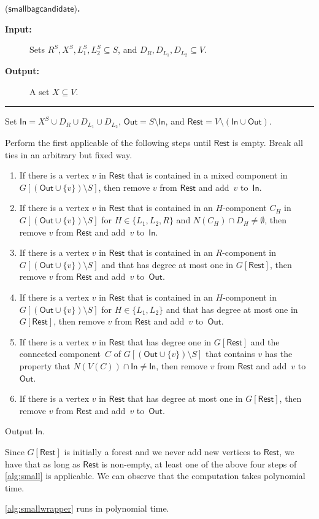 \documentclass[a4paper,UKenglish,cleveref, autoref, thm-restate, numberwithinsect]{lipics-v2021}
\newcounter{algorithm}
\newenvironment{algorithm}[3][]{\refstepcounter{algorithm}\renewcommand{\arraystretch}{.6}
\begin{center}
\begin{mdframed}[nobreak=true]{\normalsize\sffamily{\bfseries Algorithm~\thealgorithm} (#1){\bfseries .}}

\vspace{-2ex}
\begin{normalsize}
\begin{description}
 \item[\textbf{Input:}]  #2
 \item[\textbf{Output:}]  #3
\end{description}

\vspace{-1ex}

\hrule

\vspace{1ex}

}
{
\end{normalsize}
\end{mdframed}
\end{center}
}
\newcommand{\smallbagc}{\mathsf{smallbagcandidate}}
\newcommand{\In}{\mathsf{In}}
\newcommand{\Out}{\mathsf{Out}}
\newcommand{\Rest}{\mathsf{Rest}}
\begin{document}
\begin{algorithm}[$\smallbagc$]{Sets $R^S,X^S,L_1^S,L_2^S\subseteq S$, and $D_R,D_{L_1},D_{L_2}\subseteq V$.}{A set $X\subseteq V$.}\label{alg:small}
Set $\In=X^S\cup D_R\cup D_{L_1}\cup D_{L_2}$, $\Out=S\setminus \In$, and $\Rest=V\setminus (\In\cup\Out)$.

Perform the first applicable of the following steps until $\Rest$ is empty.  Break all ties in an arbitrary but fixed way.
\begin{enumerate}
\item If there is a vertex $v$ in $\Rest$ that is contained in a mixed component in $G[(\Out\cup\{v\})\setminus S]$, then remove $v$ from $\Rest$ and add~$v$ to~$\In$.\label{regular:step1}
\item If there is a vertex $v$ in $\Rest$ that is contained in an $H$-component $C_H$ in $G[(\Out\cup\{v\})\setminus S]$ for $H\in\{L_1,L_2,R\}$ and $N(C_H)\cap D_H\neq \emptyset$, then remove $v$ from $\Rest$ and add~$v$ to~$\In$.\label{regular:step2}
\item If there is a vertex $v$ in $\Rest$ that is contained in an $R$-component in $G[(\Out\cup\{v\})\setminus S]$ and that has degree at most one in $G[\Rest]$, then remove $v$ from $\Rest$ and add~$v$ to~$\Out$.\label{regular:step3}
\item If there is a vertex $v$ in $\Rest$ that is contained in an $H$-component in $G[(\Out\cup\{v\})\setminus S]$ for $H\in\{L_1,L_2\}$ and that has degree at most one in $G[\Rest]$, then remove $v$ from $\Rest$ and add~$v$ to~$\Out$.\label{regular:step4}
\item If there is a vertex $v$ in $\Rest$ that has degree one in $G[\Rest]$ and the connected component~$C$ of $G[(\Out\cup\{v\})\setminus S]$ that contains $v$ has the property that $N(V(C))\cap \In\neq \In$, then remove $v$ from $\Rest$ and add~$v$ to~$\Out$.\label{regular:step5}
\item If there is a vertex $v$ in $\Rest$ that has degree at most one in $G[\Rest]$, then remove $v$ from $\Rest$ and add~$v$ to~$\Out$.\label{regular:step6}
\end{enumerate}
Output $\In$.
\end{algorithm}


Since $G[\Rest]$ is initially a forest and we never add new vertices to $\Rest$, we have that as long as $\Rest$ is non-empty, at least one of the above four steps of \cref{alg:small} is applicable. 
We can observe that the computation takes polynomial time.
\begin{observation}\label{obs:algo2running}
\cref{alg:smallwrapper} runs in polynomial time.
\end{observation}
\end{document}
